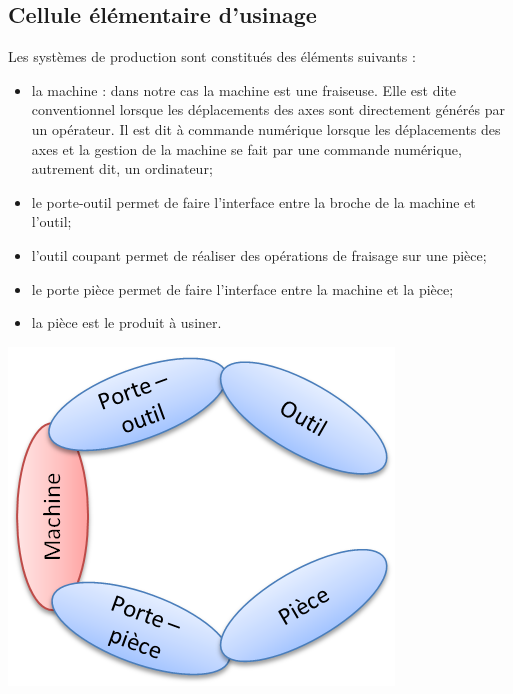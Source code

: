 \documentclass[11pt,oneside]{article}
\begin{document}
\subsection{Cellule élémentaire d'usinage}

\begin{minipage}[c]{.55\linewidth}
Les systèmes de production sont constitués des éléments suivants : 
\begin{itemize}
\item la machine : dans notre cas la machine est une fraiseuse. Elle est dite conventionnel lorsque les déplacements des axes sont directement générés par un opérateur. Il est dit à commande numérique lorsque les déplacements des axes et la gestion de la machine se fait par une commande numérique, autrement dit, un ordinateur;
\item le porte-outil permet de faire l'interface entre la broche de la machine et l'outil; 
\item l'outil coupant permet de réaliser des opérations de fraisage sur une pièce;
\item le porte pièce permet de faire l'interface entre la machine et la pièce;
\item la pièce est le produit à usiner. 
\end{itemize}
\end{minipage}\hfill
\begin{minipage}[c]{.4\linewidth}
\begin{center}
\includegraphics[width=.95\textwidth]{png/ceu}
\end{center}
\end{minipage}
\end{document}
